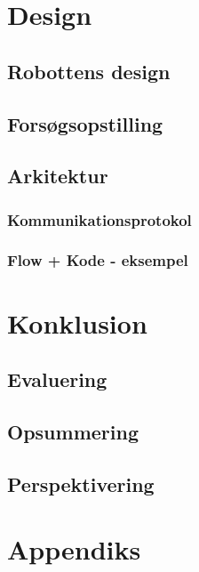 \part{Design}
\chapter{Robottens design}


\chapter{Forsøgsopstilling}

\chapter{Arkitektur}

\section{Kommunikationsprotokol}\label{kommunikation}

\section{Flow + Kode - eksempel}


\part{Konklusion}
\chapter{Evaluering}
\chapter{Opsummering}
\chapter{Perspektivering}

\appendix
\part{Appendiks}



